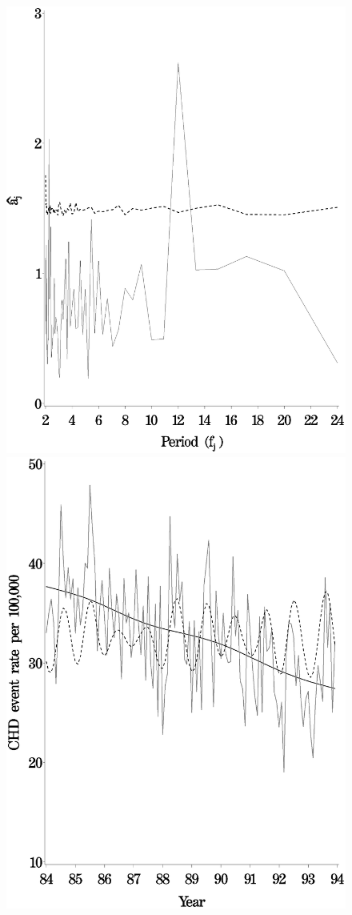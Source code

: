 \begin{figure}[!h]
{    \includegraphics[scale=0.2]{figures/periodogram_twostage_perth.eps}
    \includegraphics[scale=0.2]{figures/estimates_combined_perth.eps}
    }


\end{figure}

